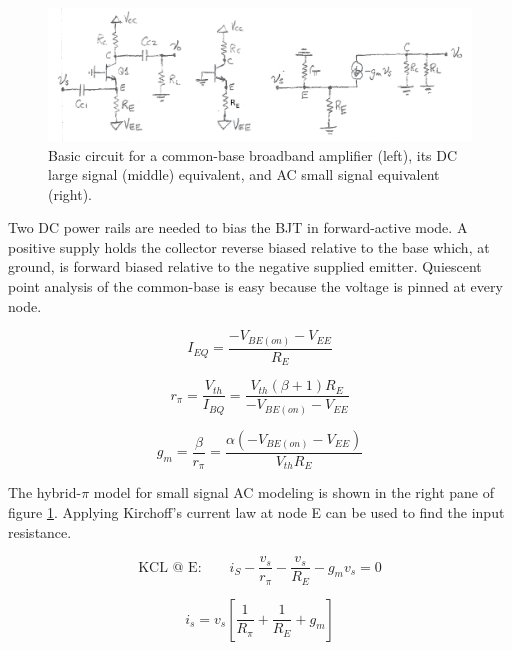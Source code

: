 \documentclass[titlepage, letterpaper, 11pt]{article}
\begin{document}
\begin{figure}[ht]
	\centering
	\includegraphics[width=\textwidth]
		{figures/commonBaseAmplifier.png}
	\caption{
		Basic circuit for a common-base broadband amplifier
		(left), its DC large signal (middle) equivalent, and
		AC small signal equivalent (right).
	}
	\label{commonBaseAmplifier}
\end{figure}

Two DC power rails are needed to bias the BJT in forward-active mode.
A positive supply holds the collector reverse biased
relative to the base which, at ground, is forward biased relative
to the negative supplied emitter. Quiescent point analysis of the
common-base is easy because the voltage is pinned at every node.

\begin{equation}
I_{EQ}=\frac{-V_{BE(on)}-V_{EE}}{R_{E}}
\end{equation}

\begin{equation}
r_{\pi}=\frac{V_{th}}{I_{BQ}}
=\frac{V_{th}(\beta+1)R_{E}}{-V_{BE(on)}-V_{EE}}
\label{commonBaseRpi}
\end{equation}

\begin{equation}
g_{m}=\frac{\beta}{r_{\pi}}
=\frac{\alpha(-V_{BE(on)}-V_{EE})}{V_{th}R_{E}}
\end{equation}

The hybrid-$\pi$ model for small signal AC modeling is shown in the
right pane of figure \ref{commonBaseAmplifier}. Applying Kirchoff's
current law at node E can be used to find the input resistance.

\begin{equation*}
\textrm{KCL @ E:}\qquad
i_{S}-\frac{v_{s}}{r_{\pi}}-\frac{v_{s}}{R_{E}}-g_{m}v_{s}=0
\end{equation*}

\begin{equation*}
i_{s}=v_{s} \left[ \frac{1}{R_{\pi}}+\frac{1}{R_{E}}+g_{m} \right]
\end{equation*}
\end{document}
